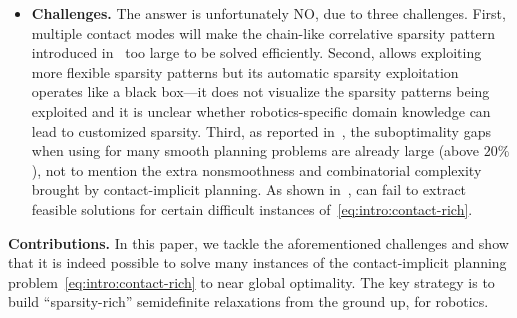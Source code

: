 \begin{itemize}
    \item \textbf{Challenges.} The answer is unfortunately NO, due to three challenges. First, multiple contact modes will make the chain-like correlative sparsity pattern introduced in~\cite{kang2024wafr-strom} too large to be solved efficiently. Second, \tssos allows exploiting more flexible sparsity patterns but its automatic sparsity exploitation operates like a black box---it does not visualize the sparsity patterns being exploited and it is unclear whether robotics-specific domain knowledge can lead to customized sparsity. Third, as reported in~\cite{teng2024ijrr-convex-geometric-motion-planning}, the suboptimality gaps when using \tssos for many smooth planning problems are already large (above $20\%$), not to mention the extra nonsmoothness and combinatorial complexity brought by contact-implicit planning. As shown in~\cite{teng2023arxiv-geometricmotionplanning-liegroup}, \tssos can fail to extract feasible solutions for certain difficult instances of~\eqref{eq:intro:contact-rich}.

\end{itemize}








\textbf{Contributions.} 
In this paper, we tackle the aforementioned challenges and show that it is indeed possible to solve many instances of the contact-implicit planning problem~\eqref{eq:intro:contact-rich} to near global optimality. The key strategy is to build ``sparsity-rich'' semidefinite relaxations from the ground up, for robotics. 

